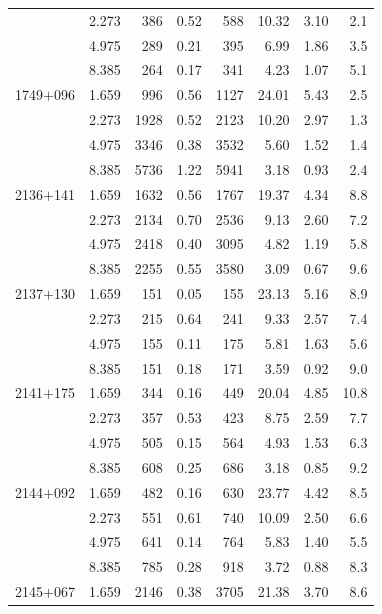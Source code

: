 \begin{longtable}{|c|c|r|c|r|r|r|r|}
           & 2.273 &   386 &  0.52 &   588 & 10.32 &  3.10 &   2.1 \\
           & 4.975 &   289 &  0.21 &   395 &  6.99 &  1.86 &   3.5 \\
           & 8.385 &   264 &  0.17 &   341 &  4.23 &  1.07 &   5.1 \\
1749$+$096 & 1.659 &   996 &  0.56 &  1127 & 24.01 &  5.43 &   2.5 \\
           & 2.273 &  1928 &  0.52 &  2123 & 10.20 &  2.97 &   1.3 \\
           & 4.975 &  3346 &  0.38 &  3532 &  5.60 &  1.52 &   1.4 \\
           & 8.385 &  5736 &  1.22 &  5941 &  3.18 &  0.93 &   2.4 \\
2136$+$141 & 1.659 &  1632 &  0.56 &  1767 & 19.37 &  4.34 &   8.8 \\
           & 2.273 &  2134 &  0.70 &  2536 &  9.13 &  2.60 &   7.2 \\
           & 4.975 &  2418 &  0.40 &  3095 &  4.82 &  1.19 &   5.8 \\
           & 8.385 &  2255 &  0.55 &  3580 &  3.09 &  0.67 &   9.6 \\
2137$+$130 & 1.659 &   151 &  0.05 &   155 & 23.13 &  5.16 &   8.9 \\
           & 2.273 &   215 &  0.64 &   241 &  9.33 &  2.57 &   7.4 \\
           & 4.975 &   155 &  0.11 &   175 &  5.81 &  1.63 &   5.6 \\
           & 8.385 &   151 &  0.18 &   171 &  3.59 &  0.92 &   9.0 \\
2141$+$175 & 1.659 &   344 &  0.16 &   449 & 20.04 &  4.85 &  10.8 \\
           & 2.273 &   357 &  0.53 &   423 &  8.75 &  2.59 &   7.7 \\
           & 4.975 &   505 &  0.15 &   564 &  4.93 &  1.53 &   6.3 \\
           & 8.385 &   608 &  0.25 &   686 &  3.18 &  0.85 &   9.2 \\
2144$+$092 & 1.659 &   482 &  0.16 &   630 & 23.77 &  4.42 &   8.5 \\
           & 2.273 &   551 &  0.61 &   740 & 10.09 &  2.50 &   6.6 \\
           & 4.975 &   641 &  0.14 &   764 &  5.83 &  1.40 &   5.5 \\
           & 8.385 &   785 &  0.28 &   918 &  3.72 &  0.88 &   8.3 \\
2145$+$067 & 1.659 &  2146 &  0.38 &  3705 & 21.38 &  3.70 &   8.6 \\

\end{longtable}
